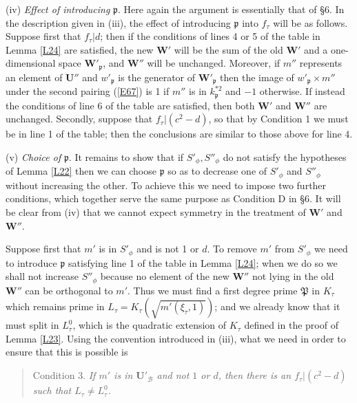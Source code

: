 \documentclass[12pt]{article}
\def\bU{{\mathbf U}}
\def\bW{{\mathbf W}}
\def\fp{{\mathfrak p}}
\def\fP{{\mathfrak P}}
\def\sB{{\mathcal B}}
\begin{document}
\medskip

\noindent (iv) \emph{Effect of introducing} $\fp$. Here again
the
argument is essentially that of \S6. In the description given
in (iii), the effect of introducing $\fp$ into $f_\tau$ will
be as follows. Suppose first that $f_\tau|d$; then if the
conditions of lines 4 or 5 of the table in Lemma \ref{L24} are
satisfied, the new $\bW'$ will be the sum of the old $\bW'$
and a one-dimensional space $\bW'_\fp$, and $\bW''$ will be
unchanged. Moreover, if $m''$ represents an element of
$\bU''$ and $w'_\fp$ is the generator of $\bW'_\fp$ then the
image of $w'_\fp\times m''$ under the second pairing
(\ref{E67}) is 1 if $m''$ is in $k^{*2}_\fp$ and $-1$
otherwise. If instead the conditions of line 6 of the table
are satisfied, then both $\bW'$ and $\bW''$ are unchanged.
Secondly, suppose that $f_\tau|(c^2-d)$, so that by Condition
1 we must be in line 1 of the table; then the conclusions are
similar to those above for line 4.

\medskip

\noindent (v) \emph{Choice of} $\fp$. It remains to show that
if $S'_\phi,S''_\phi$ do not satisfy the hypotheses of
Lemma \ref{L22} then we can choose $\fp$ so as to decrease
one of $S'_\phi$ and $S''_\phi$ without increasing the other.
To achieve this we need to impose two further conditions,
which together serve the same purpose as Condition D in \S6.
It will be clear from (iv) that we cannot expect symmetry in
the treatment of $\bW'$ and $\bW''$.

Suppose first that $m'$ is in $S'_\phi$ and is not 1 or $d$.
To remove $m'$ from $S'_\phi$ we need to introduce $\fp$
satisfying line 1 of the table in Lemma \ref{L24}; when we do
so we shall not increase $S''_\phi$ because no element of the
new $\bW''$ not lying in the old $\bW''$ can be orthogonal to
$m'$. Thus we must find a first degree prime $\fP$ in $K_\tau$
which remains prime in $L_\tau=K_\tau(\sqrt{m'(\xi_\tau,1)})$;
and we already know that it must split in $L^0_\tau$, which is
the quadratic extension of $K_\tau$ defined in the proof of
Lemma \ref{L23}. Using the convention introduced in (iii),
what we need in order to ensure that this is possible is
\begin{quote}
Condition 3. \emph{If $m'$ is in $\bU'_\sB$ and not $1$ or $d$,
then there is an $f_\tau|(c^2-d)$ such that $L_\tau\neq
L^0_\tau$.}
\end{quote}
\end{document}
